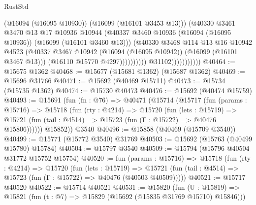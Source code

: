 \begin{lexlean}{RustStd}
\begin{coremodule}
                                          (@16094 (@16095 @10930))
                                          (@16099 (@16101 @3453 @13)))
                                        (@40330
                                          @3461
                                          @3470
                                          @13
                                          @17
                                          @10936
                                          @10944
                                          (@40337
                                            @3460
                                            @10936
                                            (@16094 (@16095 @10936))
                                            (@16099 (@16101 @3460 @13)))
                                          (@40330
                                            @3468
                                            @114
                                            @13
                                            @16
                                            @10942
                                            @4523
                                            (@40337
                                              @3467
                                              @10942
                                              (@16094 (@16095 @10942))
                                              (@16099 (@16101 @3467 @13)))
                                            (@16110 @15770 @4297))))))))))
                          @31102)))))))))))
@40464 := @15675 @1362
@40468 := @15677 (@15681 @1362) (@15687 @1362)
@40469 := @15696 @31766
@40471 := @15692 (@40469 @15711)
@40473 := @15734 (@15735 @1362)
@40474 := @15730 @40473
@40476 := @15692 (@40474 @15759)
@40493 := @15691
    (fun (fn : @76) =>
    @40471
      (@15714
        (@15717
          (fun (params : @15716) =>
          @15718
            (fun (rty : @4214) =>
            @15720
              (fun (lets : @15719) =>
              @15721 (fun (tail : @4514) => @15723 (fun (Γ : @15722) => @40476 @15806))))))
        @15852))
    @3540
@40496 := @15858 (@40469 (@15709 @3540))
@40499 := @15771 (@15772 @3540) @31769
@40503 := @15692 (@15763 (@40499 @15780) @15784)
@40504 := @15797 @3540
@40509 := @15794 (@15796 @40504 @31772 @15752 @15754)
@40520 := fun (params : @15716) =>
  @15718
    (fun (rty : @4214) =>
    @15720
      (fun (lets : @15719) =>
      @15721 (fun (tail : @4514) => @15723 (fun (Γ : @15722) => @40476 (@40503 @40509)))))
@40521 := @15717 @40520
@40522 := @15714 @40521
@40531 := @15820
    (fun (U : @15819) => @15821 (fun (t : @7) => @15829 (@15692 (@15835 @31769 @15710) @15846)))

\end{coremodule}
\end{lexlean}
